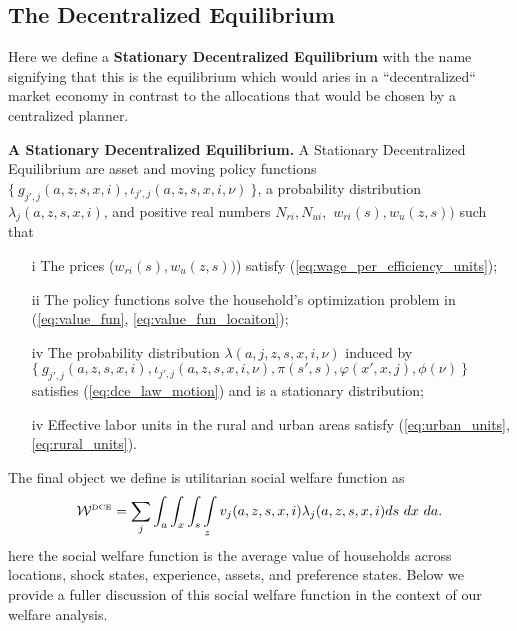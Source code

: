\documentclass[12pt,pdftex]{article}
\begin{document}
\begin{onehalfspacing}
\subsection{The Decentralized Equilibrium}

Here we define a \textbf{Stationary Decentralized Equilibrium} with the name signifying that this is the equilibrium which would aries in a ``decentralized`` market economy in contrast to the allocations that would be chosen by a centralized planner.

\textbf{A Stationary Decentralized Equilibrium.} A Stationary Decentralized Equilibrium are asset and moving policy functions $\{\ g_{j',j}(a, z, s, x, i), \iota_{j',j}(a, z, s, x, i, \nu) \ \}$, a probability distribution $\lambda_{j}(a, z, s, x, i)$, and positive real numbers $N_{ri}, N_{ui},$ $w_{ri}(s), w_{u}(z, s))$ such that
\begin{itemize}
\vspace{-.4cm}
\item[i] The prices ($w_{ri}(s), w_{u}(z, s))$) satisfy (\ref{eq:wage_per_efficiency_units});
\item[ii] The policy functions solve the household's optimization problem in (\ref{eq:value_fun}, \ref{eq:value_fun_locaiton});
\item[iv] The probability distribution $\lambda(a, j, z, s, x, i, \nu)$ induced by \\
$\{\ g_{j',j}(a, z, s, x, i), \iota_{j',j}(a, z, s, x, i, \nu), \pi(s',s), \varphi(x',x,j), \phi(\nu) \ \}$ satisfies (\ref{eq:dce_law_motion}) and is a stationary distribution;
\item[iv] Effective labor units in the rural and urban areas satisfy (\ref{eq:urban_units}, \ref{eq:rural_units}).
\end{itemize}

The final object we define is utilitarian social welfare function as
\begin{align}
\mathcal{W}^{\mbox{\tiny DCE}} = \sum_{j} \int_{a} \int_{x} \int_{s}  \int\limits_{z}  v_j(a, z, s, x, i)  \lambda_j(a, z, s, x, i) ds \ dx \ da.
\label{eq:D-social_welfare}
\end{align}
here the social welfare function is the average value of households across locations, shock states, experience, assets, and preference states. Below we provide a fuller discussion of this social welfare function in the context of our welfare analysis. 


\end{onehalfspacing}
\end{document}

